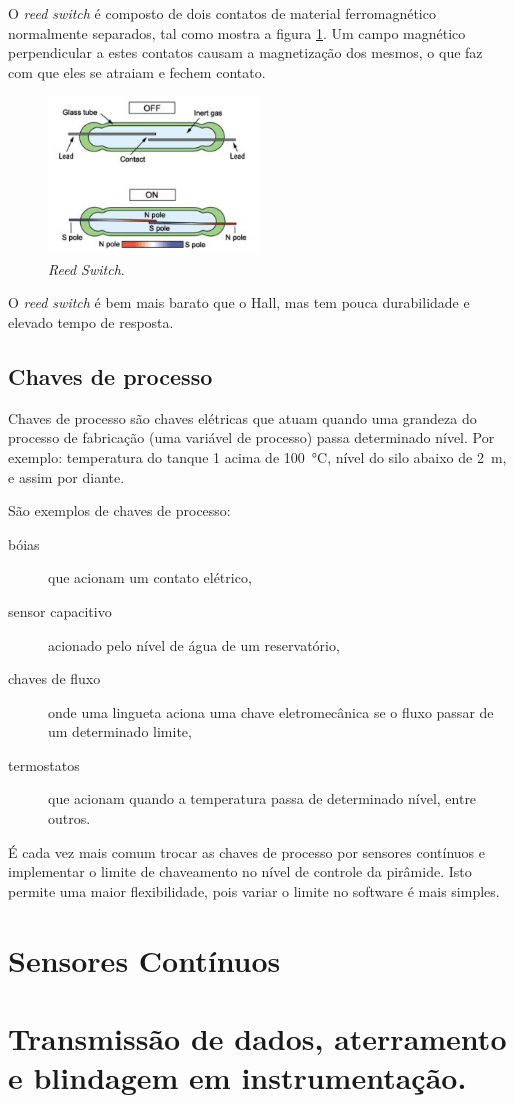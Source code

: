 O \emph{reed switch} é composto de dois contatos de material ferromagnético normalmente separados, tal como mostra a figura \ref{fig:reed}. Um campo magnético perpendicular a estes contatos causam a magnetização dos mesmos, o que faz com que eles se atraiam e fechem contato.

\begin{figure}
  \centering
  \includegraphics[width=0.5\textwidth]{figuras/reed}
  \caption{\emph{Reed Switch}.}\label{fig:reed}
\end{figure}

O \emph{reed switch} é bem mais barato que o Hall, mas tem pouca durabilidade e elevado tempo de resposta.

\subsection{Chaves de processo}

Chaves de processo são chaves elétricas que atuam quando uma grandeza do processo de fabricação (uma variável de processo) passa determinado nível. Por exemplo: temperatura do tanque 1 acima de \SI{100}{\celsius}, nível do silo abaixo de \SI{2}{\meter}, e assim por diante.

São exemplos de chaves de processo:
\begin{description}
  \item[bóias] que acionam um contato elétrico,
  \item[sensor capacitivo] acionado pelo nível de água de um reservatório,
  \item[chaves de fluxo] onde uma lingueta aciona uma chave eletromecânica se o fluxo passar de um  determinado limite,
  \item[termostatos] que acionam quando a temperatura passa de determinado nível, entre outros.
\end{description}

É cada vez mais comum trocar as chaves de processo por sensores contínuos e implementar o limite de chaveamento no nível de controle da pirâmide. Isto permite uma maior flexibilidade, pois variar o limite no software é mais simples.

\section{Sensores Contínuos}

\section{Transmissão de dados, aterramento e blindagem em instrumentação.}
